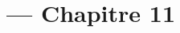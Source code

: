 
\title{\TSwiftTitle{} --- Chapitre 11}

\newcommand{\TSwiftRoot}[0]{../..} %



\maketitle

\tableofcontents




